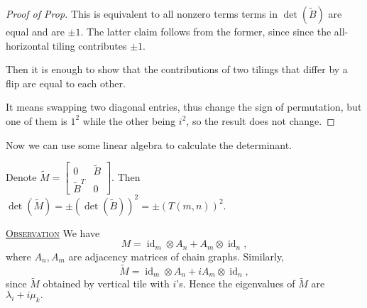 \documentclass{report}
\def \id {\operatorname{id}}
\newcommand{\fancyem}[1]{\underline{\textsc{#1}}}
\theoremstyle{definition}
\theoremstyle{remark}
\numberwithin{equation}{section}
\begin{document}
\begin{proof}[Proof of Prop]
This is equivalent to all nonzero terms terms in $\det(\tilde{B})$ are equal and are $\pm 1.$ The latter claim follows from the former, since since the all-horizontal tiling contributes $\pm 1$.

Then it is enough to show that the contributions of two tilings that differ by a flip are equal to each other.

It means swapping two diagonal entries, thus change the sign of permutation, but one of them is $1^2$ while the other being $i^2$, so the result does not change.
\end{proof}

Now we can use some linear algebra to calculate the determinant.

Denote $\tilde{M} = \begin{bmatrix}
0 & \tilde{B} \\
\tilde{B}^T & 0
\end{bmatrix}$. Then $\det(\tilde{M}) = \pm (\det(\tilde{B}))^2 = \pm (T(m, n))^2.$

\fancyem{Observation} We have \[M = \id_m \otimes A_n + A_m \otimes \id_n,\] where $A_n, A_m$ are adjacency matrices of chain graphs. Similarly,
\[
\tilde{M} = \id_m \otimes A_n + iA_m \otimes \id_n,
\]
since $\tilde{M}$ obtained by vertical tile with $i$'s. Hence the eigenvalues of $\tilde{M}$ are $\lambda_i + i\mu_k.$
\end{document}

